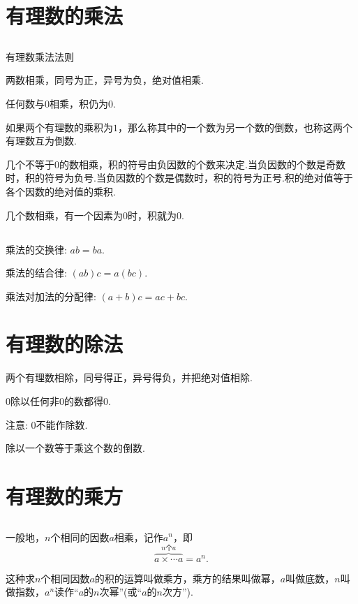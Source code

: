 \documentclass[fontset=windows]{ctexrep}
\begin{document}
\subsection{}
\section{有理数的乘法}
\subsection{}
\par {\heiti 有理数乘法法则}
\par 两数相乘，同号为正，异号为负，绝对值相乘.
\par 任何数与$0$相乘，积仍为$0$.
\par 如果两个有理数的乘积为$1$，那么称其中的一个数为另一个数的{\heiti 倒数}，也称这两个有理数{\heiti 互为倒数}.
\par 几个不等于$0$的数相乘，积的符号由负因数的个数来决定.当负因数的个数是奇数时，积的符号为负号.当负因数的个数是偶数时，积的符号为正号.积的绝对值等于各个因数的绝对值的乘积.
\par 几个数相乘，有一个因素为$0$时，积就为$0$.
\subsection{}
\par 乘法的交换律: $ab=ba$.
\par 乘法的结合律: $(ab)c=a(bc)$.
\par 乘法对加法的分配律: $(a+b)c=ac+bc$.
\section{有理数的除法}
\par 两个有理数相除，同号得正，异号得负，并把绝对值相除.
\par $0$除以任何非$0$的数都得$0$.
\par 注意: $0$不能作除数.
\par 除以一个数等于乘这个数的倒数.
\section{有理数的乘方}
\subsection{}
\par 一般地，$n$个相同的因数$a$相乘，记作$a^n$，即\[\overbrace{a \times \cdots a}^{n个a}=a^n.\]
\par 这种求$n$个相同因数$a$的积的运算叫做{\heiti 乘方}，乘方的结果叫做幂，$a$叫做底数，$n$叫做指数，$a^n$读作“$a$的$n$次幂”(或“$a$的$n$次方”).
\end{document}
